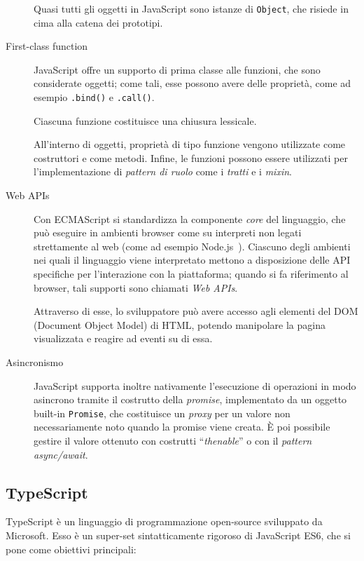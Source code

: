 \begin{description}
          Quasi tutti gli oggetti in JavaScript sono istanze di \texttt{Object}, che risiede in cima alla catena dei prototipi.

        \item[First-class function]
          JavaScript offre un supporto di prima classe alle funzioni, che sono considerate oggetti;
          come tali, esse possono avere delle proprietà, come ad esempio \texttt{.bind()} e \texttt{.call()}. %

          Ciascuna funzione costituisce una chiusura lessicale.

          All'interno di oggetti, proprietà di tipo funzione vengono utilizzate come costruttori e come metodi.
          Infine, le funzioni possono essere utilizzati per l'implementazione di \emph{pattern di ruolo} come i \emph{tratti} e i \emph{mixin}.

        \item[Web APIs]
          Con ECMAScript si standardizza la componente \emph{core} del linguaggio, che può eseguire in ambienti browser come su interpreti non legati strettamente al web (come ad esempio Node.js~\cite{5617064}).
          Ciascuno degli ambienti nei quali il linguaggio viene interpretato mettono a disposizione delle API specifiche per l'interazione con la piattaforma;
          quando si fa riferimento al browser, tali supporti sono chiamati \emph{Web APIs}.

          Attraverso di esse, lo sviluppatore può avere accesso agli elementi del DOM (Document Object Model) di HTML, potendo manipolare la pagina visualizzata e reagire ad eventi su di essa.

        \item[Asincronismo]
          JavaScript supporta inoltre nativamente l'esecuzione di operazioni in modo asincrono tramite il costrutto della \emph{promise}, implementato da un oggetto built-in \texttt{Promise},
          che costituisce un \emph{proxy} per un valore non necessariamente noto quando la promise viene creata.
          È poi possibile gestire il valore ottenuto con costrutti ``\emph{thenable}'' o con il \emph{pattern async/await}.
      \end{description}

    \subsection{TypeScript}\label{subsec:ts}
      TypeScript è un linguaggio di programmazione open-source sviluppato da Microsoft.
      Esso è un super-set sintatticamente rigoroso di JavaScript ES6, che si pone come obiettivi principali:

